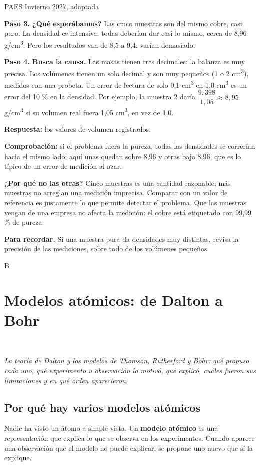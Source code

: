 \begin{elejemplo}{PAES Invierno 2027, adaptada}
{\textbf{Paso 3. ¿Qué esperábamos?} Las cinco muestras son del mismo cobre, casi puro. La densidad es intensiva: todas deberían dar casi lo mismo, cerca de 8,96 g/cm\textsuperscript{3}. Pero los resultados van de 8,5 a 9,4: varían demasiado.

\textbf{Paso 4. Busca la causa.} Las masas tienen tres decimales: la balanza es muy precisa. Los volúmenes tienen un solo decimal y son muy pequeños (1 o 2 cm\textsuperscript{3}), medidos con una probeta. Un error de lectura de solo 0,1 cm\textsuperscript{3} en 1,0 cm\textsuperscript{3} es un error del 10 \% en la densidad. Por ejemplo, la muestra 2 daría $\dfrac{9{,}398}{1{,}05} \approx 8{,}95$ g/cm\textsuperscript{3} si su volumen real fuera 1,05 cm\textsuperscript{3}, en vez de 1,0.

\textbf{Respuesta:} los valores de volumen registrados.

\textbf{Comprobación:} si el problema fuera la pureza, todas las densidades se correrían hacia el mismo lado; aquí unas quedan sobre 8,96 y otras bajo 8,96, que es lo típico de un error de medición al azar.

\textbf{¿Por qué no las otras?} Cinco muestras es una cantidad razonable; más muestras no arreglan una medición imprecisa. Comparar con un valor de referencia es justamente lo que permite detectar el problema. Que las muestras vengan de una empresa no afecta la medición: el cobre está etiquetado con 99,99 \% de pureza.

\textbf{\color{cienciaD}Para recordar.} Si una muestra pura da densidades muy distintas, revisa la precisión de las mediciones, sobre todo de los volúmenes pequeños.}{B}
\end{elejemplo}

\section[Modelos atómicos: de Dalton a Bohr]{Modelos atómicos: de Dalton a Bohr}
\modcomun\ \ {\color{gris}\itshape La teoría de Dalton y los modelos de Thomson, Rutherford y Bohr: qué propuso cada uno, qué experimento u observación lo motivó, qué explicó, cuáles fueron sus limitaciones y en qué orden aparecieron.\par}
\subsection{Por qué hay varios modelos atómicos}
Nadie ha visto un átomo a simple vista. Un \textbf{modelo atómico} es una representación que explica lo que se observa en los experimentos. Cuando aparece una observación que el modelo no puede explicar, se propone uno nuevo que sí la explique.

